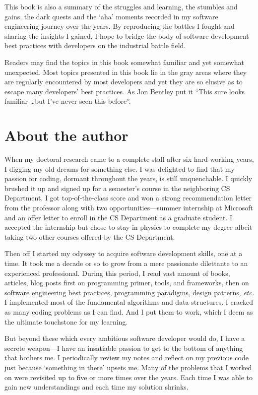\documentclass[oneside,11pt]{book}
\theoremstyle{definition}
\theoremstyle{remark}
\begin{document}
This book is also a summary of the struggles and learning, the stumbles and gains, the dark
quests and the `aha' moments recorded in my software engineering journey over the years.
By reproducing the battles I fought and sharing the insights I gained, I hope to
bridge the body of software development best practices with developers
on the industrial battle field.


Readers may find the topics in this book somewhat familiar and yet somewhat unexpected.
Most topics presented in this book lie in the gray areas where they are regularly encountered
by most developers and yet they are so elusive as to escape many developers' best practices.
As Jon Bentley put it ``This sure looks familiar \ldots but I've never seen this
before''\cite{Bentley:1986:PP}.


\section{About the author}\label{sec:whoAmI}

When my doctoral research came to a complete stall after six hard-working years, I
digging my old dreams for something else.
I was delighted to find that my passion for coding,
dormant throughout the years, is still unquenchable.
I quickly brushed it up and signed up for a semester's course in the neighboring CS Department, I
got top-of-the-class score and won a strong recommendation letter from the professor along with
two opportunities---summer internship at Microsoft and an offer letter to enroll in
the CS Department as a graduate student.
I accepted the internship but chose to stay in physics to complete my degree albeit taking two
other courses offered by the CS Department.


Then off I started my odyssey to acquire software development skills, one at a time.
It took me a decade or so to grow from a mere passionate dilettante to an experienced professional.
During this period, I read vast amount of books, articles, blog posts first on programming
primer, tools, and frameworks, then on software engineering best practices, programming paradigms,
design patterns, \textit{etc.}
I implemented most of the fundamental algorithms and data structures.
I cracked as many coding problems as I can find.
And I put them to work, which I deem as the ultimate touchstone for my learning.


But beyond these which every ambitious software developer would do,
I have a secrete weapon---I have an insatiable passion to get to the bottom
of anything that bothers me.
I periodically review my notes and reflect on my previous code just because
`something in there' upsets me.
Many of the problems that I worked on were revisited up to five or more times over the years.
Each time I was able to gain new understandings and each time my solution shrinks.
\end{document}
